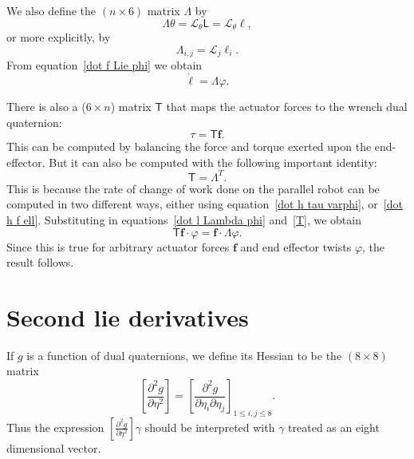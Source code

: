 \documentclass[reqno,12pt]{amsart}
\newcommand{\liederiv}{\mathcal L}
\begin{document}
We also define the $(n \times 6)$ matrix $\mathsf \Lambda$ by
\begin{equation}
\label{Lambda}
\mathsf \Lambda \theta = \liederiv_\theta \mathsf L = \liederiv_\theta \bm \ell ,
\end{equation}
or more explicitly, by
\begin{equation}
\mathsf \Lambda_{i,j} = \liederiv_j \mathsf \ell_i .
\end{equation}
From equation~\eqref{dot f Lie phi} we obtain
\begin{equation}
\label{dot l Lambda phi}
\dot{\bm \ell} = \mathsf \Lambda \varphi .
\end{equation}

There is also a ($6 \times n$) matrix $\mathsf T$ that maps the actuator forces to the wrench dual quaternion:
\begin{equation}
\label{T}
\tau = \mathsf T \bm f .
\end{equation}
This can be computed by balancing the force and torque exerted upon the end-effector.  But it can also be computed with the following important identity:
\begin{equation}
\label{T=L^T}
\mathsf T = \mathsf \Lambda^T.
\end{equation}
This is because the rate of change of work done on the parallel robot can be computed in two different ways, either using equation~\eqref{dot h tau varphi}, or~\eqref{dot h f ell}.  Substituting in equations~\eqref{dot l Lambda phi} and~\eqref{T}, we obtain
\begin{equation}
\mathsf T \bm f \cdot \varphi = \bm f \cdot \mathsf \Lambda \varphi.
\end{equation}
Since this is true for arbitrary actuator forces $\bm f$ and end effector twists $\varphi$, the result follows.

\section{Second lie derivatives}

If $g$ is a function of dual quaternions, we define its Hessian to be the $(8 \times 8)$ matrix
\begin{equation}
\left[\frac{\partial^2 g}{\partial \eta^2}\right] = \left[\frac{\partial^2 g}{\partial \eta_i\partial \eta_j}\right] _{ 1 \le i,j \le 8 }.
\end{equation}
Thus the expression $\left[\frac{\partial^2 g}{\partial \eta^2}\right] \gamma$ should be interpreted with $\gamma$ treated as an eight dimensional vector.
\end{document}

